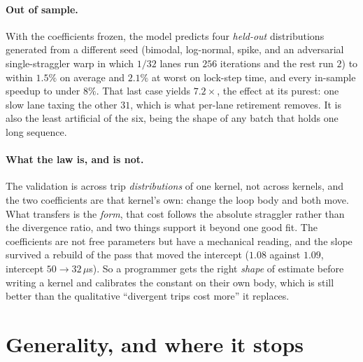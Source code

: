 \documentclass[sigplan,screen,review]{acmart}
\begin{document}
\paragraph{Out of sample.} With the coefficients frozen, the model predicts four
\emph{held-out} distributions generated from a different seed (bimodal, log-normal, spike,
and an adversarial single-straggler warp in which $1/32$ lanes run $256$ iterations and the rest
run $2$) to within $1.5\%$ on average and $2.1\%$ at worst on lock-step time, and every
in-sample speedup to under $8\%$. That last case yields $7.2\times$, the effect at its purest:
one slow lane taxing the other $31$, which is what per-lane retirement removes. It is also
the least artificial of the six, being the shape of any batch that holds one long
sequence.

\paragraph{What the law is, and is not.} The validation is across trip
\emph{distributions} of one kernel, not across kernels, and the two coefficients are that
kernel's own: change the loop body and both move. What transfers is the \emph{form}, that
cost follows the absolute straggler rather than the divergence ratio, and two things
support it beyond one good fit. The coefficients are not free parameters but have a
mechanical reading, and the slope survived a rebuild of the pass that moved the intercept
($1.08$ against $1.09$, intercept $50\rightarrow32\,\mu$s). So a programmer gets the right
\emph{shape} of estimate before writing a kernel and calibrates the constant on their own
body, which is still better than the qualitative ``divergent trips cost more'' it
replaces.

\section{Generality, and where it stops}\label{sec:general}
\end{document}
